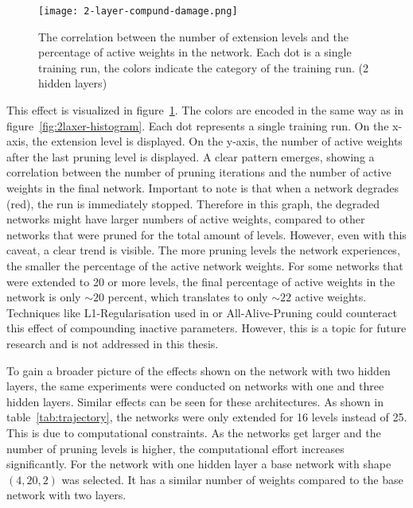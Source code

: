 \begin{figure}[ht] %
    \centering
    \texttt{[image: 2-layer-compund-damage.png]}
    \caption[Correlation extension levels and rate of active weights]{
    The correlation between the number of extension levels and the percentage of active weights in the network.
    Each dot is a single training run, the colors indicate the category of the training run. (2 hidden layers)
    }\label{fig:collateral_damage}
\end{figure}

This effect is visualized in figure~\ref{fig:collateral_damage}.
The colors are encoded in the same way as in figure~\ref{fig:2laxer-histogram}.
Each dot represents a single training run. 
On the x-axis, the extension level is displayed.
On the y-axis, the number of active weights after the last pruning level is displayed.
A clear pattern emerges, showing a correlation between the number of pruning iterations and the number of active weights in the final network.
Important to note is that when a network degrades (red), the run is immediately stopped.
Therefore in this graph, the degraded networks might have larger numbers of active weights, compared to other networks that were pruned for the total amount of levels.
However, even with this caveat, a clear trend is visible.
The more pruning levels the network experiences, the smaller the percentage of the active network weights.
For some networks that were extended to 20 or more levels, the final percentage of active weights in the network is only $\sim20$ percent, which translates to only $\sim22$ active weights.
Techniques like L1-Regularisation used in \autocite{HanEtAl15} or All-Alive-Pruning \autocite{AllAlivePruning} could counteract this effect of compounding inactive parameters.
However, this is a topic for future research and is not addressed in this thesis. 

To gain a broader picture of the effects shown on the network with two hidden layers, the same experiments were conducted on networks with one and three hidden layers.
Similar effects can be seen for these architectures.
As shown in table~\ref{tab:trajectory}, the networks were only extended for 16 levels instead of 25.
This is due to computational constraints. 
As the networks get larger and the number of pruning levels is higher, the computational effort increases significantly.
For the network with one hidden layer a base network with shape $(4,20,2)$ was selected.
It has a similar number of weights compared to the base network with two layers.

